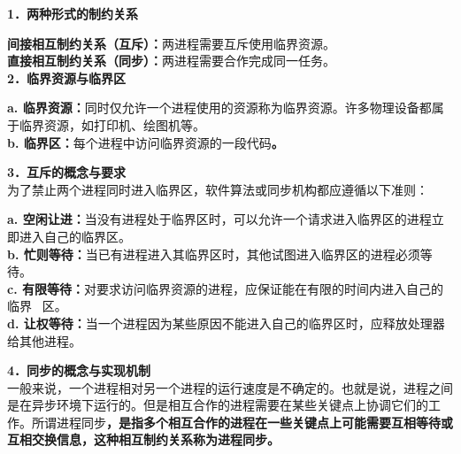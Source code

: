 \textbf{{1．两种形式的制约关系}}

\textbf{间接相互制约关系（互斥）：}{两进程需要互斥使用临界资源。}\textbf{\\
直接相互制约关系（同步）：}两进程需要合作完成同一任务。\\

\textbf{{2．临界资源与临界区}}

\textbf{{a.
临界资源：}}{同时仅允许一个进程使用的资源称为临界资源}。许多物理设备都属于临界资源，如打印机、绘图机等。\\

\textbf{{b. 临界区：}}{}{每个进程中访问临界资源的一段代码}\textbf{。}

\textbf{{3．互斥的概念与要求}}\\
为了禁止两个进程同时进入临界区，软件算法或同步机构都应遵循以下准则：

\textbf{a.
空闲让进：}当没有进程处于临界区时，可以允许一个请求进入临界区的进程立即进入自己的临界区。\\
\textbf{b.
忙则等待：}当已有进程进入其临界区时，其他试图进入临界区的进程必须等待。\\
\textbf{c.
有限等待：}对要求访问临界资源的进程，应保证能在有限的时间内进入自己的临界
~区。\\
\textbf{d.
让权等待：}当一个进程因为某些原因不能进入自己的临界区时，应释放处理器给其他进程。

\textbf{{4．同步的概念与实现机制}}\\
一般来说，一个进程相对另一个进程的运行速度是不确定的。也就是说，进程之间是在异步环境下运行的。但是相互合作的进程需要在某些关键点上协调它们的工作。所谓进程同步\textbf{，是指多个相互合作的进程在一些关键点上可能需要互相等待或互相交换信息，这种相互制约关系称为进程同步。}
